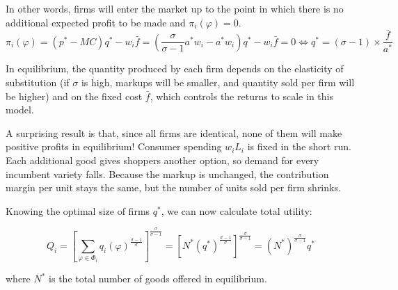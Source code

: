 \documentclass[11pt,letterpaper]{article}
\begin{document}
In other words, firms will enter the market up to the point in which there is no additional expected profit to be made and $\pi_i(\varphi) =0$.
\begin{equation*}
    \pi_i(\varphi) = (p^* - MC) q^* - w_i \bar{f} = \left(\frac{\sigma}{\sigma -1}a^*w_i - a^* w_i\right) q^* - w_i \bar{f} =0 \iff q^* = (\sigma-1) \times \frac{\bar{f}}{a^*}  
\end{equation*}

In equilibrium, the quantity produced by each firm depends on the elasticity of substitution (if $\sigma$ is high, markups will be smaller, and quantity sold per firm will be higher) and on the fixed cost $\bar{f}$, which controls the returns to scale in this model. 

A surprising result is that, since all firms are identical, none of them will make positive profits in equilibrium! Consumer spending $w_iL_i$ is fixed in the short run. Each additional good gives shoppers another option, so demand for every incumbent variety falls. Because the markup is unchanged, the contribution margin per unit stays the same, but the number of units sold per firm shrinks.

Knowing the optimal size of firms $q^*$, we can now calculate total utility:

\begin{equation*}
    Q_i = \left[ \sum_{\varphi \in \Phi_i } q_i(
\varphi)^{\tfrac{\sigma-1}{\sigma}} \right]^{\tfrac{\sigma}{\sigma-1} }  = \left[ N^* ( q^*
)^{\tfrac{\sigma-1}{\sigma}} \right]^{\tfrac{\sigma}{\sigma-1} } = (N^*)^{\tfrac{\sigma}{\sigma-1} } q^* 
\end{equation*}

\noindent where $N^*$ is the total number of goods offered in equilibrium.
\end{document}
